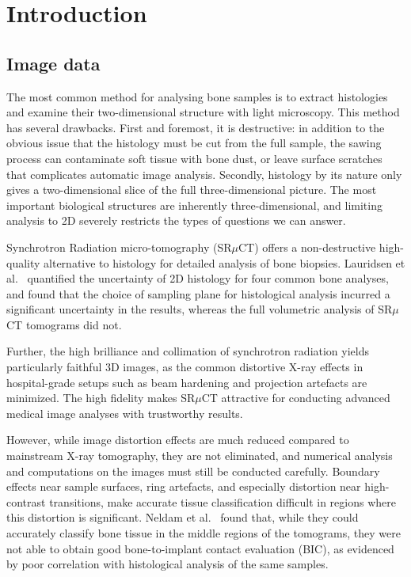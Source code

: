 
\section{Introduction}
\label{sec:intro}


\subsection{Image data}

The most common method for analysing bone samples is to extract histologies and examine their two-dimensional structure with light microscopy.
This method has several drawbacks. First and foremost, it is destructive: in addition to the obvious issue that the histology must be cut
from the full sample, the sawing process can contaminate soft tissue with bone dust, or leave surface scratches that complicates automatic image analysis.
Secondly, histology by its nature only gives a two-dimensional slice of the full three-dimensional picture. The most important biological structures
are inherently three-dimensional, and limiting analysis to 2D severely restricts the types of questions we can answer. 

Synchrotron Radiation micro-tomography (SR$\mu$CT) offers a non-destructive high-quality alternative to histology for detailed analysis of bone biopsies.
Lauridsen et al.~\cite{torsten2018} quantified the uncertainty of 2D histology for four common bone analyses, and found that the choice of sampling
plane for histological analysis incurred a significant uncertainty in the results, whereas the full volumetric analysis of SR$\mu$CT tomograms did not.

Further, the high brilliance and collimation of synchrotron radiation yields particularly faithful 3D images, as the common distortive X-ray effects
in hospital-grade setups such as beam hardening and projection artefacts are minimized. The high fidelity
makes SR$\mu$CT attractive for conducting advanced medical image analyses with trustworthy results.

However, while image distortion effects are much reduced compared to mainstream X-ray tomography, they are not eliminated, and numerical
analysis and computations on the images must still be conducted carefully. Boundary
effects near sample surfaces, ring artefacts, and especially distortion near high-contrast transitions, make accurate tissue classification
difficult in regions where this distortion is significant. Neldam et al.~\cite{sporring} found that, while they could accurately classify
bone tissue in the middle regions of the tomograms, they were not able to obtain good bone-to-implant contact evaluation (BIC), as evidenced
by poor correlation with histological analysis of the same samples.

